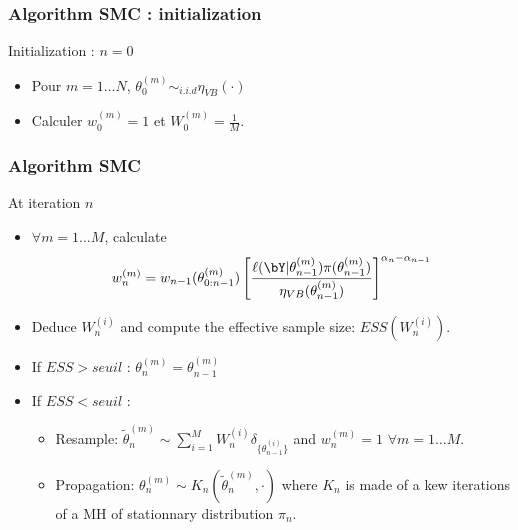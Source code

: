 \begin{frame}\frametitle{Algorithm  SMC : initialization}

\begin{block}{Initialization :  $n=0$}
\begin{itemize}
\item Pour $m=1\dots N$, $\theta_0^{(m)} \sim _{i.i.d} \eta_{VB}(\cdot)$
\item Calculer $w_0^{(m)} =1 $ et  $W_0^{(m)}=\frac{1}{M}$. 
\end{itemize}
\end{block}

\end{frame}

\begin{frame}\frametitle{Algorithm SMC}
\begin{block}{At iteration $n$}

\begin{itemize}
\item $\forall m=1\dots M$, calculate $$w^{(m)}_n =w_{n-1}(\theta^{(m)}_{0:n-1}) \left[\frac{\ell(\bY | \theta^{(m)}_{n-1}) \pi(\theta^{(m)}_{n-1})}{\eta_{VB}(\theta^{(m)}_{n-1})} \right]^{\alpha_n-\alpha_{n-1}}  $$
\item Deduce $W_n^{(i)}$ and compute the effective sample size: $ESS(W_n^{(i)})$. 
\item If $ESS>seuil$ :   $\theta_n^{(m)} = \theta_{n-1}^{(m)}$
\item If $ESS<seuil$ : 
\begin{itemize}
\item \vert Resample:  \noir$\widetilde{\theta}_{n}^{(m)} \sim \sum_{i=1}^M W_n^{(i)}\delta_{\{\theta_{n-1}^{(i)}\}}$ and $w_n^{(m)}=1$ $\forall m=1\dots M$. 
\item \vert Propagation: \noir $\theta^{(m)}_n \sim K_n(\widetilde{\theta}_{n}^{(m)}, \cdot)$ where $K_n$ is made of a kew iterations of a MH of stationnary distribution  $\pi_n$. 
\end{itemize}
 
\end{itemize}
\end{block}
\end{frame}

